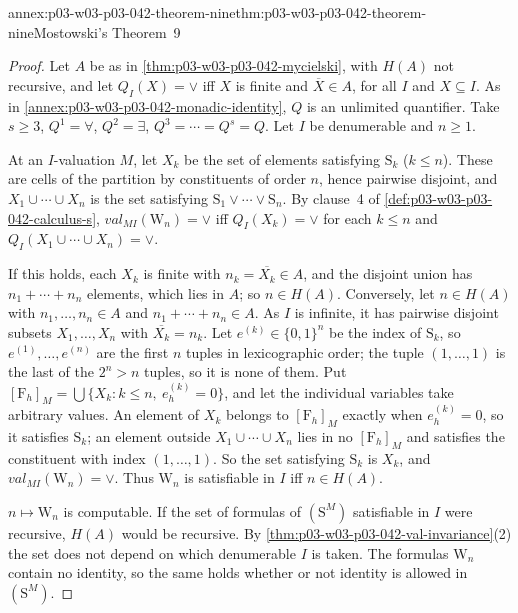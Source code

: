 \begin{annexitem}{annex:p03-w03-p03-042-theorem-nine}{thm:p03-w03-p03-042-theorem-nine}{Mostowski's Theorem~9}
\begin{proof}
Let \(A\) be as in \cref{thm:p03-w03-p03-042-mycielski}, with \(H(A)\)
not recursive, and let \(Q_I(X)=\vee\) iff \(X\) is finite and
\(\overline X\in A\), for all \(I\) and \(X\subseteq I\).  As in
\cref{annex:p03-w03-p03-042-monadic-identity}, \(Q\) is an unlimited
quantifier.  Take \(s\geq3\), \(Q^1=\forall\), \(Q^2=\exists\),
\(Q^3=\cdots=Q^s=Q\).  Let \(I\) be denumerable and \(n\geq1\).

At an \(I\)-valuation \(M\), let \(X_k\) be the set of elements
satisfying \(\mathrm S_k\) (\(k\leq n\)).  These are cells of the
partition by constituents of order \(n\), hence pairwise disjoint, and
\(X_1\cup\cdots\cup X_n\) is the set satisfying \(\mathrm S_1\vee\cdots
\vee\mathrm S_n\).  By clause~4 of \cref{def:p03-w03-p03-042-calculus-s},
\(\mathit{val}_{MI}(\mathrm W_n)=\vee\) iff \(Q_I(X_k)=\vee\) for each
\(k\leq n\) and \(Q_I(X_1\cup\cdots\cup X_n)=\vee\).

If this holds, each \(X_k\) is finite with \(n_k=\overline{X_k}\in A\),
and the disjoint union has \(n_1+\cdots+n_n\) elements, which lies in
\(A\); so \(n\in H(A)\).  Conversely, let \(n\in H(A)\) with
\(n_1,\ldots,n_n\in A\) and \(n_1+\cdots+n_n\in A\).  As \(I\) is
infinite, it has pairwise disjoint subsets \(X_1,\ldots,X_n\) with
\(\overline{X_k}=n_k\).  Let \(e^{(k)}\in\{0,1\}^n\) be the index of
\(\mathrm S_k\), so \(e^{(1)},\ldots,e^{(n)}\) are the first \(n\) tuples
in lexicographic order; the tuple \((1,\ldots,1)\) is the last of the
\(2^n>n\) tuples, so it is none of them.  Put \([\mathrm F_h]_M=\bigcup\{
X_k:k\leq n,\ e^{(k)}_h=0\}\), and let the individual variables take
arbitrary values.  An element of \(X_k\) belongs to \([\mathrm F_h]_M\)
exactly when \(e^{(k)}_h=0\), so it satisfies \(\mathrm S_k\); an element
outside \(X_1\cup\cdots\cup X_n\) lies in no \([\mathrm F_h]_M\) and
satisfies the constituent with index \((1,\ldots,1)\).  So the set
satisfying \(\mathrm S_k\) is \(X_k\), and \(\mathit{val}_{MI}(\mathrm
W_n)=\vee\).  Thus \(\mathrm W_n\) is satisfiable in \(I\) iff \(n\in
H(A)\).

\(n\mapsto\mathrm W_n\) is computable.  If the set of formulas of
\((\mathrm S^M)\) satisfiable in \(I\) were recursive, \(H(A)\) would be
recursive.  By \cref{thm:p03-w03-p03-042-val-invariance}(2) the set does
not depend on which denumerable \(I\) is taken.  The formulas
\(\mathrm W_n\) contain no identity, so the same holds whether or not
identity is allowed in \((\mathrm S^M)\).
\end{proof}
\end{annexitem}


